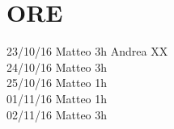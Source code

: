 
\section{ORE}
23/10/16 
Matteo 3h 
Andrea XX\\
24/10/16 
Matteo 3h\\
25/10/16 
Matteo 1h\\
01/11/16
Matteo 1h\\
02/11/16
Matteo 3h\\
